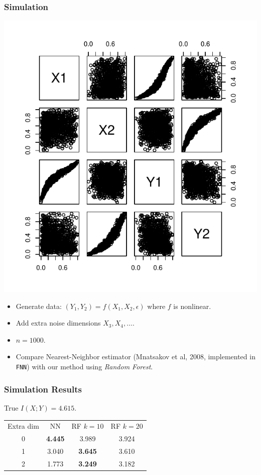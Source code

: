 \documentclass{beamer}
\begin{document}
\begin{frame}
\frametitle{Simulation}

\begin{center}
\includegraphics[scale = 0.34]{../idloss/sim1_pairs.pdf}
\end{center}
\begin{itemize}
\item Generate data: $(Y_1, Y_2) = f(X_1, X_2, \epsilon)$ where $f$ is nonlinear.
\item Add extra noise dimensions $X_3, X_4, \hdots$.
\item $n = 1000$.
\item Compare Nearest-Neighbor estimator (Mnatsakov et al, 2008, implemented in {\tt FNN}) with our method using \emph{Random Forest}.
\end{itemize}


\end{frame}

\begin{frame}
\frametitle{Simulation Results}

True $I(X; Y) = 4.615$.

\begin{center}
\begin{tabular}{c||c|c|c}
Extra dim & NN & RF $k = 10$ & RF $k=20$\\
0 & \textbf{4.445} & 3.989 & 3.924\\
1 & 3.040 & \textbf{3.645} & 3.610\\
2 & 1.773 & \textbf{3.249} & 3.182
\end{tabular}
\end{center}


\end{frame}
\end{document}
